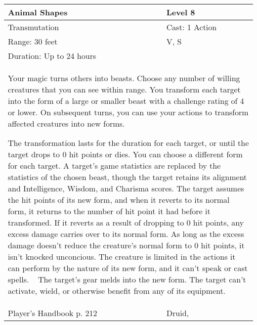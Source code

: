 \documentclass[11pt]{report}
\begin{document}
\begin{table}[H]
	\begin{tabular}{||p{6cm}|p{6cm}||}
		\hline\hline
		\bf{Animal Shapes} & Level 8\\ \hline
		Transmutation & Cast: 1 Action\\ \hline
		Range: 30 feet & V, S\\ \hline
		Duration: Up to 24 hours & \\ \hline
		\multicolumn{2}{||p{12cm}||}{Your magic turns others into beasts. 
Choose any number of willing creatures that you can see within range. You transform each target into the form of a large or smaller beast with a challenge rating of 4 or lower. On subsequent turns, you can use your actions to transform affected creatures into new forms. 

The transformation lasts for the duration for each target, or until the target drops to 0 hit points or dies. You can choose a different form for each target. A target’s game statistics are replaced by the statistics of the chosen beast, though the target retains its alignment and Intelligence, Wisdom, and Charisma scores. The target assumes the hit points of its new form, and when it reverts to its normal form, it returns to the number of hit point it had before it transformed. If it reverts as a result of dropping to 0 hit points, any excess damage carries over to its normal form. As long as the excess damage doesn’t reduce the creature’s normal form to 0 hit points, it isn’t knocked unconcious. The creature is limited in the actions it can perform by the nature of its new form, and it can’t speak or cast spells. 
 
The target’s gear melds into the new form. The target can’t activate, wield, or otherwise benefit from any of its equipment.}\\ \hline
Player's Handbook p. 212 & Druid, \\ \hline\hline
	\end{tabular}
\end{table}
\end{document}
